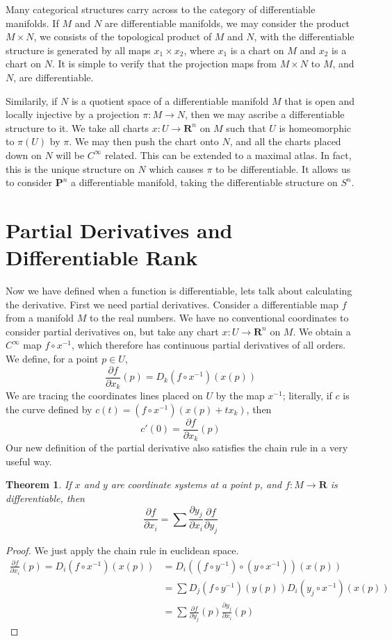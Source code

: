 \documentclass[12pt]{report}
\theoremstyle{plain}
\newtheorem{theorem}{Theorem}[chapter]
\theoremstyle{definition}
\begin{document}
Many categorical structures carry across to the category of differentiable manifolds. If $M$ and $N$ are differentiable manifolds, we may consider the product $M \times N$, we consists of the topological product of $M$ and $N$, with the differentiable structure is generated by all maps $x_1 \times x_2$, where $x_1$ is a chart on $M$ and $x_2$ is a chart on $N$. It is simple to verify that the projection maps from $M \times N$ to $M$, and $N$, are differentiable.

Similarily, if $N$ is a quotient space of a differentiable manifold $M$ that is open and locally injective by a projection $\pi:M \to N$, then we may ascribe a differentiable structure to it. We take all charts $x:U \to \mathbf{R}^n$ on $M$ such that $U$ is homeomorphic to $\pi(U)$ by $\pi$. We may then push the chart onto $N$, and all the charts placed down on $N$ will be $C^\infty$ related. This can be extended to a maximal atlas. In fact, this is the unique structure on $N$ which causes $\pi$ to be differentiable. It allows us to consider $\mathbf{P}^n$ a differentiable manifold, taking the differentiable structure on $S^n$.

\section{Partial Derivatives and Differentiable Rank}

Now we have defined when a function is differentiable, lets talk about calculating the derivative. First we need partial derivatives. Consider a differentiable map $f$ from a manifold $M$ to the real numbers. We have no conventional coordinates to consider partial derivatives on, but take any chart $x:U \to \mathbf{R}^n$ on $M$. We obtain a $C^\infty$ map $f \circ x^{-1}$, which therefore has continuous partial derivatives of all orders. We define, for a point $p \in U$,
%
\[ \frac{\partial f}{\partial x_k} (p) = D_k(f \circ x^{-1})(x(p)) \]
%
We are tracing the coordinates lines placed on $U$ by the map $x^{-1}$; literally, if $c$ is the curve defined by $c(t) = (f \circ x^{-1})(x(p) + tx_k)$, then
%
\[ c'(0) = \frac{\partial f}{\partial x_k}(p) \]
%
Our new definition of the partial derivative also satisfies the chain rule in a very useful way.

\begin{theorem}
    If $x$ and $y$ are coordinate systems at a point $p$, and $f:M \to \mathbf{R}$ is differentiable, then
    \[ \frac{\partial f}{\partial x_i} = \sum \frac{\partial y_j}{\partial x_i} \frac{\partial f}{\partial y_j} \]
\end{theorem}
\begin{proof}
    We just apply the chain rule in euclidean space.
    \begin{align*}
        \frac{\partial f}{\partial x_i}(p) = D_i(f \circ x^{-1})(x(p)) &= D_i((f \circ y^{-1}) \circ (y \circ x^{-1}))(x(p))\\
        &= \sum D_j(f \circ y^{-1})(y(p)) D_i(y_j \circ x^{-1})(x(p))\\
        &= \sum \frac{\partial f}{\partial y_j}(p) \frac{\partial y_j}{\partial x_i}(p)
    \end{align*}
\end{proof}
\end{document}
